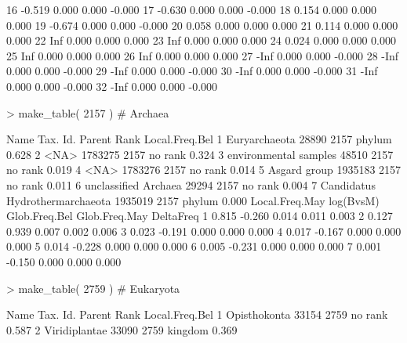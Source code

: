 \documentclass{article}
\begin{document}
\begin{Schunk}
\begin{Soutput}
16    -0.519         0.000         0.000    -0.000
17    -0.630         0.000         0.000    -0.000
18     0.154         0.000         0.000     0.000
19    -0.674         0.000         0.000    -0.000
20     0.058         0.000         0.000     0.000
21     0.114         0.000         0.000     0.000
22       Inf         0.000         0.000     0.000
23       Inf         0.000         0.000     0.000
24     0.024         0.000         0.000     0.000
25       Inf         0.000         0.000     0.000
26       Inf         0.000         0.000     0.000
27      -Inf         0.000         0.000    -0.000
28      -Inf         0.000         0.000    -0.000
29      -Inf         0.000         0.000    -0.000
30      -Inf         0.000         0.000    -0.000
31      -Inf         0.000         0.000    -0.000
32      -Inf         0.000         0.000    -0.000
\end{Soutput}
\begin{Sinput}
> make_table( 2157 ) # Archaea
\end{Sinput}
\begin{Soutput}
                            Name Tax. Id. Parent    Rank Local.Freq.Bel
1                  Euryarchaeota    28890   2157  phylum          0.628
2                           <NA>  1783275   2157 no rank          0.324
3          environmental samples    48510   2157 no rank          0.019
4                           <NA>  1783276   2157 no rank          0.014
5                   Asgard group  1935183   2157 no rank          0.011
6           unclassified Archaea    29294   2157 no rank          0.004
7 Candidatus Hydrothermarchaeota  1935019   2157  phylum          0.000
  Local.Freq.May log(BvsM) Glob.Freq.Bel Glob.Freq.May DeltaFreq
1          0.815    -0.260         0.014         0.011     0.003
2          0.127     0.939         0.007         0.002     0.006
3          0.023    -0.191         0.000         0.000     0.000
4          0.017    -0.167         0.000         0.000     0.000
5          0.014    -0.228         0.000         0.000     0.000
6          0.005    -0.231         0.000         0.000     0.000
7          0.001    -0.150         0.000         0.000     0.000
\end{Soutput}
\begin{Sinput}
> make_table( 2759 ) # Eukaryota
\end{Sinput}
\begin{Soutput}
                      Name Tax. Id. Parent    Rank Local.Freq.Bel
1             Opisthokonta    33154   2759 no rank          0.587
2            Viridiplantae    33090   2759 kingdom          0.369

\end{Soutput}
\end{Schunk}
\end{document}
